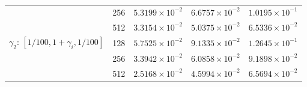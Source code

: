 \documentclass[11pt,a4paper]{article}
\begin{document}
\begin{table}[htbp]
\begin{tabular}{@{} l c c c c @{}}
                            & 256 & $5.3199 \times 10^{-2}$ & $6.6757 \times 10^{-2}$ & $1.0195 \times 10^{-1}$ \\
                            & 512 & $3.3154 \times 10^{-2}$ & $5.0375 \times 10^{-2}$ & $6.5336 \times 10^{-2}$ \\
        \midrule
        $\gamma_2$: $[1/100, 1+\gamma_i, 1/100]$ & 128 & $5.7525 \times 10^{-2}$ & $9.1335 \times 10^{-2}$ & $1.2645 \times 10^{-1}$ \\
                            & 256 & $3.3942 \times 10^{-2}$ & $6.0858 \times 10^{-2}$ & $9.1898 \times 10^{-2}$ \\
                            & 512 & $2.5168 \times 10^{-2}$ & $4.5994 \times 10^{-2}$ & $6.5694 \times 10^{-2}$ \\
        \bottomrule
    \end{tabular}
\end{table}
\end{document}
